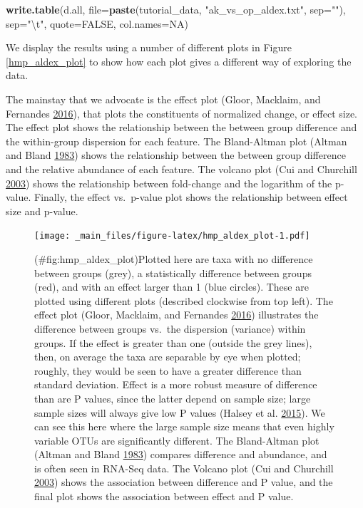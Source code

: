 \documentclass[onecolumn]{book}
\newenvironment{Shaded}{\begin{snugshade}}{\end{snugshade}}
\newcommand{\CharTok}[1]{\textcolor[rgb]{0.31,0.60,0.02}{#1}}
\newcommand{\DataTypeTok}[1]{\textcolor[rgb]{0.13,0.29,0.53}{#1}}
\newcommand{\KeywordTok}[1]{\textcolor[rgb]{0.13,0.29,0.53}{\textbf{#1}}}
\newcommand{\NormalTok}[1]{#1}
\newcommand{\OtherTok}[1]{\textcolor[rgb]{0.56,0.35,0.01}{#1}}
\newcommand{\StringTok}[1]{\textcolor[rgb]{0.31,0.60,0.02}{#1}}
\theoremstyle{definition}
\theoremstyle{definition}
\theoremstyle{definition}
\theoremstyle{remark}
\begin{document}
\begin{Shaded}
\begin{Highlighting}[]
\KeywordTok{write.table}\NormalTok{(d.all, }\DataTypeTok{file=}\KeywordTok{paste}\NormalTok{(tutorial_data, }\StringTok{"ak_vs_op_aldex.txt"}\NormalTok{, }\DataTypeTok{sep=}\StringTok{""}\NormalTok{), }\DataTypeTok{sep=}\StringTok{"}\CharTok{\textbackslash{}t}\StringTok{"}\NormalTok{,}
    \DataTypeTok{quote=}\OtherTok{FALSE}\NormalTok{, }\DataTypeTok{col.names=}\OtherTok{NA}\NormalTok{)}
\end{Highlighting}
\end{Shaded}

We display the results using a number of different plots in Figure
\ref{hmp_aldex_plot} to show how each plot gives a different way of
exploring the data.

The mainstay that we advocate is the effect plot (Gloor, Macklaim, and
Fernandes \protect\hyperlink{ref-Gloor:2015}{2016}), that plots the
constituents of normalized change, or effect size. The effect plot shows
the relationship between the between group difference and the
within-group dispersion for each feature. The Bland-Altman plot (Altman
and Bland \protect\hyperlink{ref-altman:1983}{1983}) shows the
relationship between the between group difference and the relative
abundance of each feature. The volcano plot (Cui and Churchill
\protect\hyperlink{ref-Cui:2003aa}{2003}) shows the relationship between
fold-change and the logarithm of the p-value. Finally, the effect
vs.~p-value plot shows the relationship between effect size and p-value.

\begin{figure}
\centering
\texttt{[image: \_main\_files/figure-latex/hmp\_aldex\_plot-1.pdf]}
\caption{(\#fig:hmp\_aldex\_plot)Plotted here are taxa with no
difference between groups (grey), a statistically difference between
groups (red), and with an effect larger than 1 (blue circles). These are
plotted using different plots (described clockwise from top left). The
effect plot (Gloor, Macklaim, and Fernandes
\protect\hyperlink{ref-Gloor:2015}{2016}) illustrates the difference
between groups vs.~the dispersion (variance) within groups. If the
effect is greater than one (outside the grey lines), then, on average
the taxa are separable by eye when plotted; roughly, they would be seen
to have a greater difference than standard deviation. Effect is a more
robust measure of difference than are P values, since the latter depend
on sample size; large sample sizes will always give low P values (Halsey
et al. \protect\hyperlink{ref-Halsey:2015aa}{2015}). We can see this
here where the large sample size means that even highly variable OTUs
are significantly different. The Bland-Altman plot (Altman and Bland
\protect\hyperlink{ref-altman:1983}{1983}) compares difference and
abundance, and is often seen in RNA-Seq data. The Volcano plot (Cui and
Churchill \protect\hyperlink{ref-Cui:2003aa}{2003}) shows the
association between difference and P value, and the final plot shows the
association between effect and P value.}
\end{figure}
\end{document}
